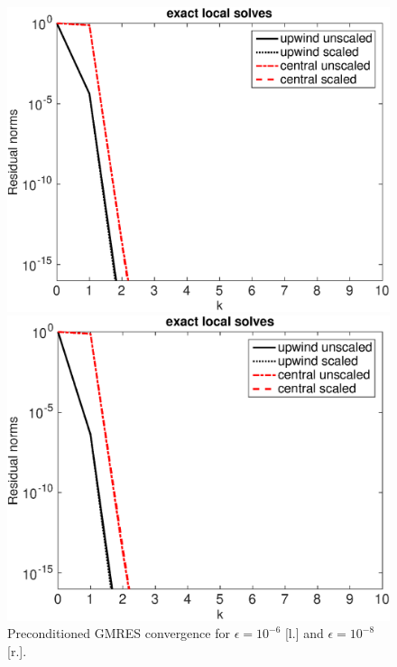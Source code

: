 %
\begin{figure}[tbhp]
\begin{minipage}[t]{0.48\linewidth}
\includegraphics[width=0.98\linewidth]{figures/gmres_eps_1e-06_N_198_prec}
\end{minipage}
%
\begin{minipage}[t]{0.48\linewidth}
\includegraphics[width=0.98\linewidth]{figures/gmres_eps_1e-08_N_198_prec}
\end{minipage}
\caption{Preconditioned GMRES convergence for $\epsilon=10^{-6}$ [l.] and $\epsilon=10^{-8}$ [r.].}
\label{fig:1D:GMRES.N198.eps8.prec}
\end{figure}
%

